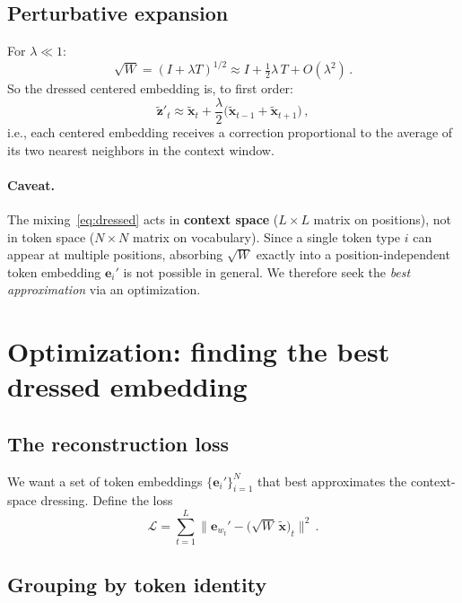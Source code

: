 \documentclass[11pt]{article}
\newcommand{\ee}{\bm{e}}
\begin{document}
\subsection{Perturbative expansion}

For $\lambda \ll 1$:
\begin{equation}\label{eq:sqrt-expand}
    \sqrt{W} = (I + \lambda T)^{1/2} \approx I + \tfrac{1}{2}\lambda\, T + O(\lambda^2)\,.
\end{equation}
So the dressed centered embedding is, to first order:
\begin{equation}\label{eq:dressed-perturbative}
    \tilde{\bm{z}}'_t \approx \tilde{\bm{x}}_t + \frac{\lambda}{2}\big(\tilde{\bm{x}}_{t-1} + \tilde{\bm{x}}_{t+1}\big)\,,
\end{equation}
i.e., each centered embedding receives a correction proportional to the average of its two nearest neighbors in the context window.

\paragraph{Caveat.} The mixing~\eqref{eq:dressed} acts in \textbf{context space} ($L \times L$ matrix on positions), not in token space ($N \times N$ matrix on vocabulary). Since a single token type $i$ can appear at multiple positions, absorbing $\sqrt{W}$ exactly into a position-independent token embedding $\ee_i'$ is not possible in general. We therefore seek the \emph{best approximation} via an optimization.

\section{Optimization: finding the best dressed embedding}\label{sec:optimize}

\subsection{The reconstruction loss}

We want a set of token embeddings $\{\ee_i'\}_{i=1}^N$ that best approximates the context-space dressing. Define the loss
\begin{equation}\label{eq:loss}
    \mathcal{L} = \sum_{t=1}^{L} \big\|\ee_{w_t}' - \big(\sqrt{W}\, \tilde{\bm{x}}\big)_t\big\|^2\,.
\end{equation}

\subsection{Grouping by token identity}
\end{document}
